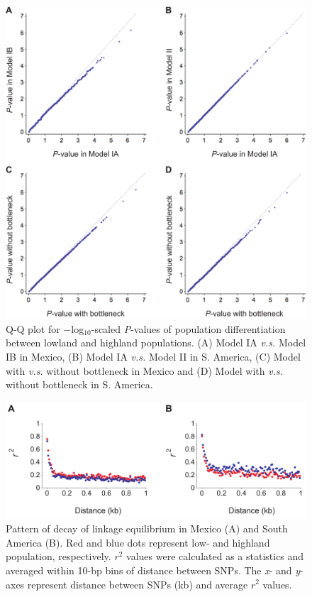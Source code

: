 \begin{figure}[h]
  \begin{center}
    \includegraphics[width=0.6\columnwidth]{fig/bot2.pdf}
    \caption{Q-Q plot for $-$log$_{10}$-scaled \emph{P}-values of population differentiation between lowland and highland populations. (A) Model IA \emph{v.s.} Model IB in Mexico, (B) Model IA \emph{v.s.} Model II in S. America, (C) Model with \emph{v.s.} without bottleneck in Mexico and (D) Model with \emph{v.s.} without bottleneck in S. America.}
    \label{fig:qq}
  \end{center}
\end{figure}



\begin{figure}[h]
  \begin{center}
    \includegraphics[width=0.7\columnwidth]{fig/LD.pdf}
    \caption{Pattern of decay of linkage equilibrium in Mexico (A) and South America (B).  Red and blue dots represent low- and highland population, respectively.  $r^2$ values were calculated as a statistics and averaged within 10-bp bins of distance between SNPs.  The \emph{x}- and \emph{y}-axes represent distance between SNPs (kb) and average $r^2$ values.}
    \label{supp:LD}
  \end{center}
\end{figure}

